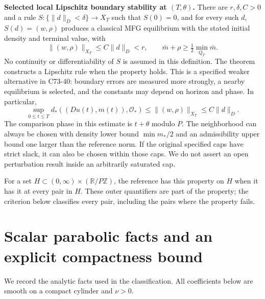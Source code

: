 \documentclass[11pt,a4paper]{article}
\begin{document}
\textbf{Selected local Lipschitz boundary stability at $(T,\theta)$.}
There are $r,\delta,C>0$ and a rule $S:\{\|d\|_D<\delta\}\to X_T$
such that $S(0)=0$, and for every such $d$, $S(d)=(w,\rho)$ produces
a classical MFG equilibrium with the stated initial density and terminal
value, with
\begin{equation}\tag{W1}\label{W1}
 \|(w,\rho)\|_{X_T}\leq C\|d\|_D<r,
 \qquad \bar m+\rho\geq\tfrac12\min_{Q_T}\bar m.
\end{equation}
No continuity or differentiability of $S$ is assumed in this definition.
The theorem constructs a Lipschitz rule when the property
holds. This is a specified weaker alternative in C73-40: boundary errors
are measured more strongly, a nearby equilibrium is selected, and the
constants may depend on horizon and phase. In particular,
\begin{equation}\tag{W2}\label{W2}
 \sup_{0\leq t\leq T}d_*((Du(t),m(t)),\mathcal O_*)
 \leq\|(w,\rho)\|_{X_T}\leq C\|d\|_D.
\end{equation}
The comparison phase in this estimate is $t+\theta$ modulo $P$.
The neighborhood can always be chosen with density lower bound
$\min m_*/2$ and an admissibility upper bound one larger than the
reference norm. If the original specified caps have strict slack, it
can also be chosen within those caps. We do not assert an open
perturbation result inside an arbitrarily saturated cap.

For a set $H\subset(0,\infty)\times(\mathbb R/P\mathbb Z)$, the
reference has this property on $H$ when it has it at every pair in $H$.
These outer quantifiers are part of the property; the criterion below
classifies every pair, including the pairs where the property fails.

\section{Scalar parabolic facts and an explicit compactness bound}
We record the analytic facts used in the classification. All coefficients
below are smooth on a compact cylinder and $\nu>0$.
\end{document}
